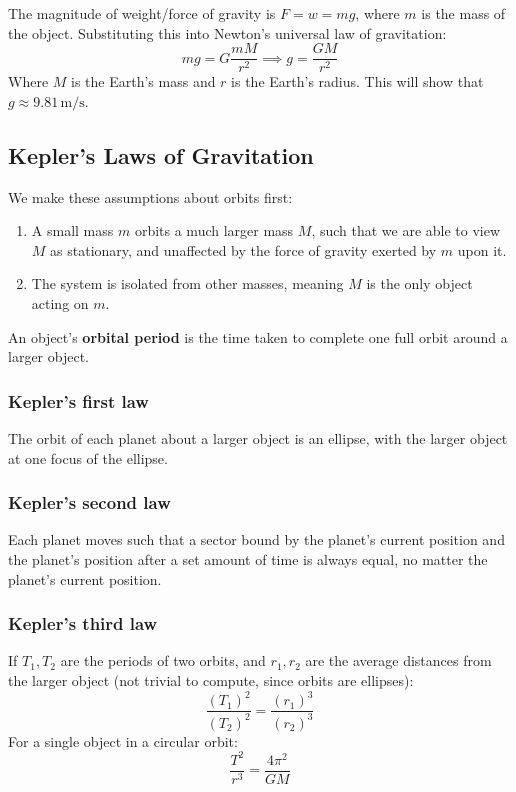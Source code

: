 \documentclass{article}
\newcommand{\definition}[1]{\begin{tcolorbox}[colback=red!5!white,colframe=red!75!black,parbox=false] #1 \end{tcolorbox}}
\newcommand{\theorem}[2]{\begin{tcolorbox}[title={#1},colback=blue!5!white,colframe=blue!75!black,parbox=false] #2 \end{tcolorbox}}
\begin{document}
The magnitude of weight/force of gravity is $F=w=mg$, where $m$ is the mass of the object. Substituting this into Newton's universal law of gravitation:
\begin{equation*}
    mg=G \frac{mM}{r^2}
	\implies 
    g=\frac{GM}{r^2}
\end{equation*}
Where $M$ is the Earth's mass and $r$ is the Earth's radius. This will show that $g\approx 9.81\,\si{\meter\per\second}$.

\subsection{Kepler's Laws of Gravitation}

We make these assumptions about orbits first:
\begin{enumerate}
	\item A small mass $m$ orbits a much larger mass $M$, such that we are able to view $M$ as stationary, and unaffected by the force of gravity exerted by $m$ upon it.
	\item The system is isolated from other masses, meaning $M$ is the only object acting on $m$.
\end{enumerate}

\definition{An object's \textbf{orbital period} is the time taken to complete one full orbit around a larger object.}

\subsubsection{Kepler's first law}

\theorem{Kepler's first law}{The orbit of each planet about a larger object is an ellipse, with the larger object at one focus of the ellipse.}

\subsubsection{Kepler's second law}

\theorem{Kepler's second law}{Each planet moves such that a sector bound by the planet's current position and the planet's position after a set amount of time is always equal, no matter the planet's current position.}

\subsubsection{Kepler's third law}

\theorem{Kepler's third law}{If $T_1,T_2$ are the periods of two orbits, and $r_1,r_2$ are the average distances from the larger object (not trivial to compute, since orbits are ellipses):
\begin{equation*}
    \frac{(T_1)^2}{(T_2)^2}=\frac{(r_1)^3}{(r_2)^3}
\end{equation*}
For a single object in a circular orbit:
\begin{equation*}
	\frac{T^2}{r^3}=\frac{4\pi^2}{GM}
\end{equation*}}
\end{document}
